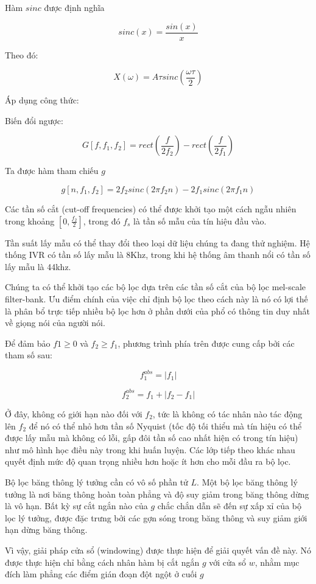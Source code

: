 \documentclass{article}
\begin{document}
	Hàm $sinc$ được định nghĩa
	
	$$sinc(x) = \frac{sin(x)}{x}$$
	
	Theo đó:
	
	$$X(\omega) = A\tau sinc\left(\frac{\omega \tau}{2}\right)$$
	
	Áp dụng công thức:
	
	Biến đổi ngược:
	
	$$G[f, f_1, f_2] = rect\left(\frac{f}{2f_2}\right) -  rect\left(\frac{f}{2f_1}\right)$$
	
	Ta được hàm tham chiếu $g$
	
	$$g[n, f_1, f_2] = 2f_2sinc(2\pi f_2 n) - 2f_1sinc(2\pi f_1 n)$$ 
	
	Các tần số cắt (cut-off frequencies) có thể được khởi tạo một cách ngẫu nhiên trong khoảng $\left[0, \frac{f_2}{2}\right]$, trong đó $f_s$ là tần số mẫu của tín hiệu đầu vào.
	
	Tần suất lấy mẫu có thể thay đổi theo loại dữ liệu chúng ta đang thử nghiệm. Hệ thống IVR có tần số lấy mẫu là 8Khz, trong khi hệ thống âm thanh nổi có tần số lấy mẫu là 44khz.
	
	Chúng ta có thể khởi tạo các bộ lọc dựa trên các tần số cắt của bộ lọc mel-scale filter-bank. Ưu điểm chính của việc chỉ định bộ lọc theo cách này là nó có lợi thế là phân bổ trực tiếp nhiều bộ lọc hơn ở phần dưới của phổ có thông tin duy nhất về giọng nói của người nói.
	
	Để đảm bảo $f1 \geq 0$ và $f_2 \geq f_1$, phương trình phía trên được cung cấp bởi các tham số sau:
	
	$$f_{1}^{abs} = |f_1|$$
	
	$$f_{2}^{abs} = f_1 + |f_2 - f_1| $$
	
	Ở đây, không có giới hạn nào đối với $f_2$, tức là không có tác nhân nào tác động lên $f_2$ để nó có thể nhỏ hơn tần số Nyquist (tốc độ tối thiểu mà tín hiệu có thể được lấy mẫu mà không có lỗi, gấp đôi tần số cao nhất hiện có trong tín hiệu) như mô hình học điều này trong khi huấn luyện. Các lớp tiếp theo khác nhau quyết định mức độ quan trọng nhiều hơn hoặc ít hơn cho mỗi đầu ra bộ lọc.
	
	Bộ lọc băng thông lý tưởng cần có vô số phần tử $L$. Một bộ lọc băng thông lý tưởng là nơi băng thông hoàn toàn phẳng và độ suy giảm trong băng thông dừng là vô hạn. Bất kỳ sự cắt ngắn nào của $g$ chắc chắn dẫn sẽ đến sự xấp xỉ của bộ lọc lý tưởng, được đặc trưng bởi các gợn sóng trong băng thông và suy giảm giới hạn dừng băng thông.
	
	Vì vậy, giải pháp cửa sổ (windowing) được thực hiện để giải quyết vấn đề này. Nó được thực hiện chỉ bằng cách nhân hàm bị cắt ngắn $g$ với cửa sổ $w$, nhằm mục đích làm phẳng các điểm gián đoạn đột ngột ở cuối $g$
	
\end{document}
